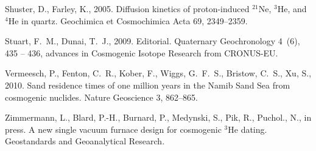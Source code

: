\documentclass[authoryear,review,12pt]{elsarticle}
\begin{document}
\begin{thebibliography}{27}
Shuster, D., Farley, K., 2005. Diffusion kinetics of proton-induced
  $^{21}${N}e, $^{3}${H}e, and $^{4}${H}e in quartz. Geochimica et Cosmochimica
  Acta 69, 2349--2359.

Stuart, F.~M., Dunai, T.~J., 2009. Editorial. Quaternary Geochronology 4~(6),
  435 -- 436, advances in Cosmogenic Isotope Research from CRONUS-EU.

{Vermeesch}, P., {Fenton}, C.~R., {Kober}, F., {Wiggs}, G.~F.~S., {Bristow},
  C.~S., {Xu}, S., 2010. {Sand residence times of one million years in the
  Namib Sand Sea from cosmogenic nuclides}. Nature Geoscience 3, 862--865.

Zimmermann, L., Blard, P.-H., Burnard, P., Medynski, S., Pik, R., Puchol., N.,
  in press. A new single vacuum furnace design for cosmogenic $^3${H}e dating.
  Geostandards and Geoanalytical Research.

\end{thebibliography}
\end{document}
